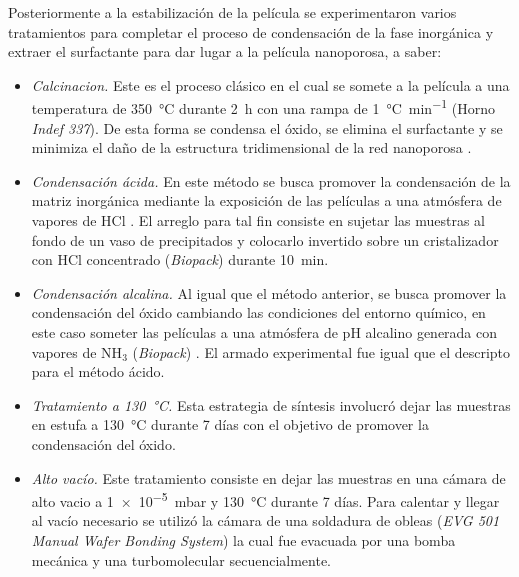 		Posteriormente a la estabilización de la película se experimentaron varios tratamientos para completar el proceso de condensación de la fase inorgánica y extraer el surfactante para dar lugar a la película nanoporosa, a saber:

				\begin{itemize}

				\item \textit{Calcinacion.} Este es el proceso clásico en el cual se somete a la película a una temperatura de \SI{350}{\celsius} durante \SI{2}{\hour} con una rampa de \SI{1}{\celsius.\minute^{-1}} (Horno \textit{Indef 337}). De esta forma se condensa el óxido, se elimina el surfactante y se minimiza el daño de la estructura tridimensional de la red nanoporosa \cite{Crepaldi2003}.

				\item \textit{Condensación ácida.} En este método se busca promover la condensación de la matriz inorgánica mediante la exposición de las películas a una atmósfera de vapores de HCl \cite{Doshi2000a}. El arreglo para tal fin consiste en sujetar las muestras al fondo de un vaso de precipitados y colocarlo invertido sobre un cristalizador con HCl concentrado (\textit{Biopack}) durante \SI{10}{\minute}. 

				\item \textit{Condensación alcalina.} Al igual que el método anterior, se busca promover la condensación del óxido cambiando las condiciones del entorno químico, en este caso someter las películas a una atmósfera de pH alcalino generada con vapores de NH$_3$ (\textit{Biopack}) \cite{Soler-Illia2012,Soler-Illia2011}. El armado experimental fue igual que el descripto para el método ácido.

				\item \textit{Tratamiento a \SI{130}{\celsius}.} Esta estrategia de síntesis involucró dejar las muestras en estufa a \SI{130}{\celsius} durante 7 días con el objetivo de promover la condensación del óxido.

				\item \textit{Alto vacío.} Este tratamiento consiste en dejar las muestras en una cámara de alto vacio a \SI{1e-5}{\milli\bar} y \SI{130}{\celsius} durante 7 días. Para calentar y llegar al vacío necesario se utilizó la cámara de una soldadura de obleas (\textit{EVG 501 Manual Wafer Bonding System}) la cual fue evacuada por una bomba mecánica y una turbomolecular secuencialmente.

				\end{itemize}
					
